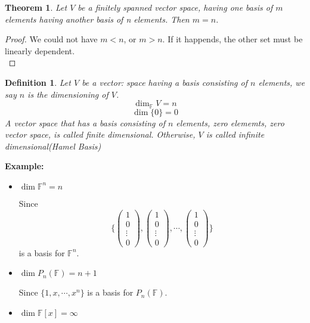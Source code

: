 \documentclass[12pt]{article}
\theoremstyle{plain}
\newtheorem{theorem}{Theorem}[subsection]
\newtheorem{definition}{Definition}[subsection]
\newcommand{\mF}{{\mathbb{F}}}
\begin{document}
	\begin{theorem}
		Let $V$ be a finitely spanned vector space, having one basis of 
		$m$ elements having another basis of n elements. 
		Then $m=n$. 
	\end{theorem}
	\begin{proof}
		We could not have $m<n$, or $m>n$. If it happends, the other set must
		be linearly dependent. \\
	\end{proof}

	\begin{definition}
		Let $V$ be a vector: space having a basis consisting of $n$ elements,
		we say $n$ is the dimensioning of $V$. 
		\[
			\dim _{\mF} V = n
		\]
		\[
			\dim\{0\} = 0
		\]
		A vector space that has a basis consisting of $n$ elements, zero 
		elememts, zero vector space, is called finite dimensional. 
		Otherwise, $V$ is called infinite dimensional(\textcolor{Periwinkle}
		{Hamel Basis})\\
	\end{definition}
	
	{\color{Brown}
	{
		\textbf{Example: }
		\begin{itemize}
			\item 
				$\dim \mF^n = n$
				
				Since 
				\[
					\bigg\{ 
					\begin{pmatrix}
							1\\
							0\\
							\vdots\\
							0
					\end{pmatrix}
					, 
					\begin{pmatrix}
							1\\
							0\\
							\vdots\\
							0
					\end{pmatrix}
					,
					\cdots,
					\begin{pmatrix}
							1\\
							0\\
							\vdots\\
							0
					\end{pmatrix}
					\bigg \}
				\]
				is a basis for $\mF^n$.

			\item 
				$\dim P_n(\mF) = n + 1$

			Since $\{1, x, \cdots, x^n\}$ is a basis for $P_n(\mF)$. 
			
		\item $\dim \mF[x] = \infty$ \\
		\end{itemize}
	}	
	}
	
\end{document}
